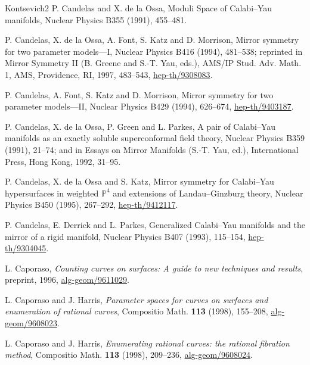 \begin{thebibliography}{Kontsevich2}
\hypertarget{bib:Cd}{}
P. Candelas and X. de la Ossa,
Moduli Space of Calabi--Yau manifolds,
Nuclear Physics B355 (1991), 455--481.

\hypertarget{bib:CdFKM}{}
P. Candelas, X. de la Ossa, A. Font, S. Katz and D. Morrison,
Mirror symmetry for two parameter models---I,
Nuclear Physics B416 (1994), 481--538;
reprinted in Mirror Symmetry II (B. Greene and S.-T. Yau, eds.),
AMS/IP Stud. Adv. Math. 1, AMS, Providence, RI, 1997, 483--543,
\href{https://arxiv.org/abs/hep-th/9308083}{hep-th/9308083}.

\hypertarget{bib:CFKM}{}
P. Candelas, A. Font, S. Katz and D. Morrison,
Mirror symmetry for two parameter models---II,
Nuclear Physics B429 (1994), 626--674, \href{https://arxiv.org/abs/hep-th/9403187}{hep-th/9403187}.

\hypertarget{bib:CdGP}{}
P. Candelas, X. de la Ossa, P. Green and L. Parkes,
A pair of Calabi--Yau manifolds as an exactly soluble superconformal field theory,
Nuclear Physics B359 (1991), 21--74; and in Essays on Mirror Manifolds
(S.-T. Yau, ed.), International Press, Hong Kong, 1992, 31--95.

\hypertarget{bib:CdK}{}
P. Candelas, X. de la Ossa and S. Katz,
Mirror symmetry for Calabi--Yau hypersurfaces in weighted
\(\mathbb P^4\) and extensions of Landau--Ginzburg theory,
Nuclear Physics B450 (1995), 267--292, \href{https://arxiv.org/abs/hep-th/9412117}{hep-th/9412117}.

\hypertarget{bib:CDP}{}
P. Candelas, E. Derrick and L. Parkes, Generalized Calabi--Yau manifolds and the
mirror of a rigid manifold, Nuclear Physics B407 (1993), 115--154, \href{https://arxiv.org/abs/hep-th/9304045}{hep-th/9304045}.

\hypertarget{bib:Caporaso}{} L. Caporaso, \emph{Counting curves on surfaces: A guide to new techniques and results}, preprint, 1996, \href{https://arxiv.org/abs/alg-geom/9611029}{alg-geom/9611029}.

\hypertarget{bib:CH1}{} L. Caporaso and J. Harris, \emph{Parameter spaces for curves on surfaces and enumeration of rational curves}, Compositio Math. \textbf{113} (1998), 155--208, \href{https://arxiv.org/abs/alg-geom/9608023}{alg-geom/9608023}.

\hypertarget{bib:CH2}{} L. Caporaso and J. Harris, \emph{Enumerating rational curves: the rational fibration method}, Compositio Math. \textbf{113} (1998), 209--236, \href{https://arxiv.org/abs/alg-geom/9608024}{alg-geom/9608024}.


\end{thebibliography}
